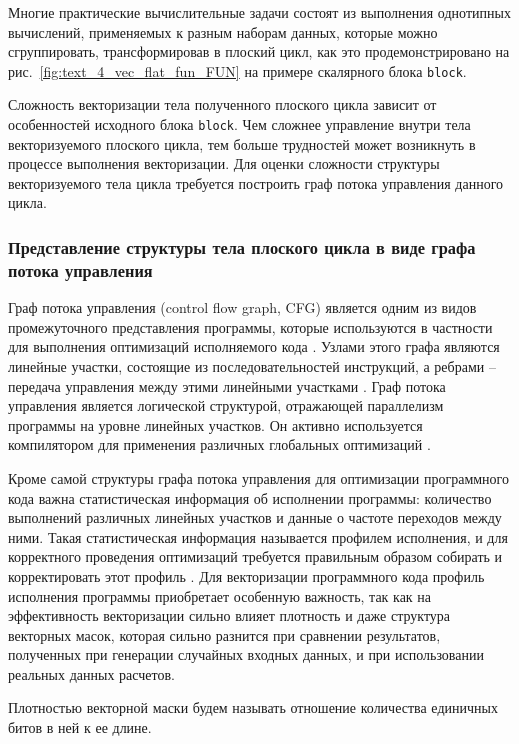 Многие практические вычислительные задачи состоят из выполнения однотипных вычислений, применяемых к разным наборам данных, которые можно сгруппировать, трансформировав в плоский цикл, как это продемонстрировано на рис.~\ref{fig:text_4_vec_flat_fun_FUN} на примере скалярного блока \texttt{block}.

Сложность векторизации тела полученного плоского цикла зависит от особенностей исходного блока \texttt{block}.
Чем сложнее управление внутри тела векторизуемого плоского цикла, тем больше трудностей может возникнуть в процессе выполнения векторизации.
Для оценки сложности структуры векторизуемого тела цикла требуется построить граф потока управления данного цикла.

\subsubsection{Представление структуры тела плоского цикла в виде графа потока управления}

Граф потока управления (control flow graph, CFG) является одним из видов промежуточного представления программы, которые используются в частности для выполнения оптимизаций исполняемого кода \cite{Muchnick1997Compilers}.
Узлами этого графа являются линейные участки, состоящие из последовательностей инструкций, а ребрами -- передача управления между этими линейными участками \cite{Rybakov2013CGF}.
Граф потока управления является логической структурой, отражающей параллелизм программы на уровне линейных участков.
Он активно используется компилятором для применения различных глобальных оптимизаций \cite{Aho2006Compilers}.

Кроме самой структуры графа потока управления для оптимизации программного кода важна статистическая информация об исполнении программы: количество выполнений различных линейных участков и данные о частоте переходов между ними.
Такая статистическая информация называется профилем исполнения, и для корректного проведения оптимизаций требуется правильным образом собирать и корректировать этот профиль \cite{Chetverina2015Profile}.
Для векторизации программного кода профиль исполнения программы приобретает особенную важность, так как на эффективность векторизации сильно влияет плотность и даже структура векторных масок, которая сильно разнится при сравнении результатов, полученных при генерации случайных входных данных, и при использовании реальных данных расчетов.

\begin{definition}
Плотностью векторной маски будем называть отношение количества единичных битов в ней к ее длине.
\end{definition}

